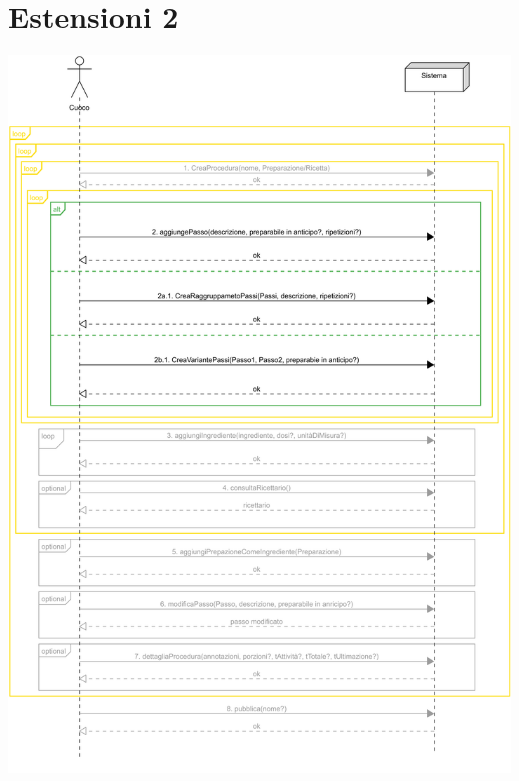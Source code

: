 \section*{Estensioni 2}
\includegraphics[max width=\textwidth, max height=190mm]{../resources/img/GRP/SSD/ext2.png}

